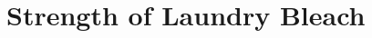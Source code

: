 \documentclass{book}
\begin{document}
 
 
 
  \newcommand\chapterlabel{}\newcommand\ChapterNameLabel{}\newcommand\labname{}\newcommand\chapterpathtocontent{}\newcommand\chapterpathtoimages{}\newcommand\chapterpath{} 

\section{Strength of Laundry Bleach}
\renewcommand\chapterlabel{Ch-acidbase}\renewcommand\ChapterNameLabel{\chapterlabel}\renewcommand\labname{bleach}\renewcommand\chapterpathtocontent{../../}\renewcommand\chapterpathtoimages{\chapterpathtocontent}\renewcommand\chapterpath{../../\chapterlabel/LAB-\labname/}


 
 
\end{document}
